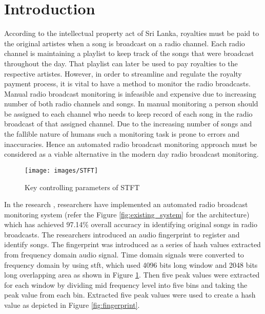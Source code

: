 \section{Introduction}

According to the intellectual property act of Sri Lanka\cite{CopyrightAct}, royalties must be paid to the original
artistes when a song is broadcast on a radio channel. Each radio channel is maintaining a playlist to keep track of
the songs that were broadcast throughout the day. That playlist can later be used to pay royalties to the respective
artistes. However, in order to streamline and regulate the royalty payment process, it is vital to have a method to monitor the radio 
broadcasts. Manual radio broadcast monitoring is infeasible and expensive due to increasing number of both radio 
channels and songs. In manual monitoring a person should be assigned to each channel who needs to keep record of each 
song in the radio broadcast of that assigned channel. Due to the increasing number of songs and the fallible nature of
humans such a monitoring task is prone to errors and inaccuracies. Hence an automated radio broadcast 
monitoring approach must be considered as a viable alternative in the modern day radio broadcast monitoring.
\vspace{12pt}

\begin{figure}[h]
    \centering
    \texttt{[image: images/STFT]}
    \caption{Key controlling parameters of STFT\cite{E.D.N.W.Senevirathna2018}}
    \label{fig:stft}
\end{figure}
\vspace{12pt}

In the research \cite{E.D.N.W.Senevirathna2018}, researchers have implemented an
automated radio broadcast monitoring system (refer the Figure \ref{fig:existing_system} for the architecture) which has 
achieved 97.14\% overall accuracy in identifying original songs
in radio broadcasts. The researchers introduced an audio fingerprint to register and identify songs. The fingerprint was
introduced as a series of hash values extracted from frequency domain audio signal. Time domain signals were converted to 
frequency domain by using \gls{stft}, which used 4096 bits long window and 2048
bits long overlapping area as shown in Figure \ref{fig:stft}. Then five peak values were extracted for each window by 
dividing mid frequency level into five bins and taking the peak value from each bin. Extracted five peak values were used to 
create a hash value as depicted in Figure \ref{fig:fingerprint}. 

